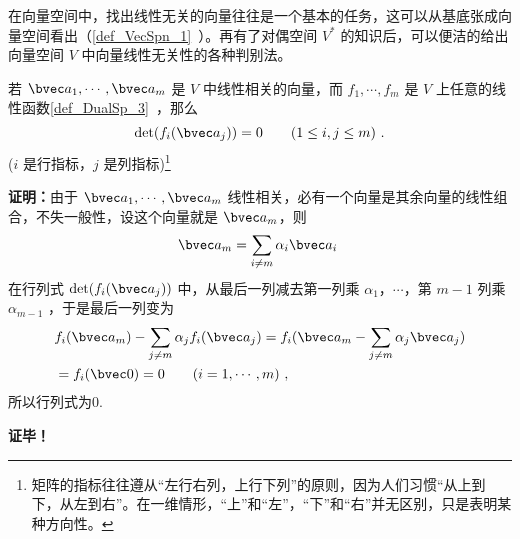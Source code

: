 
\begin{issues}
\end{issues}

在向量空间中，找出线性无关的向量往往是一个基本的任务，这可以从基底张成向量空间看出（\autoref{def_VecSpn_1}~）。再有了对偶空间 $V^*$ 的知识后，可以便洁的给出向量空间 $V$ 中向量线性无关性的各种判别法。
\begin{lemma}{}\label{lem_LinInD_1}
若 $\bvec a_1,\cdots,\bvec a_m$ 是 $V$ 中线性相关的向量，而 $f_1,\cdots,f_m$ 是 $V$ 上任意的线性函数\autoref{def_DualSp_3}~，那么
\begin{equation}
\det(f_i(\bvec a_j))=0\qquad (1\leq i,j\leq m)~.
\end{equation}
($i$ 是行指标，$j$ 是列指标)\footnote{矩阵的指标往往遵从“左行右列，上行下列”的原则，因为人们习惯“从上到下，从左到右”。在一维情形，“上”和“左”，“下”和“右”并无区别，只是表明某种方向性。}
\end{lemma}
\textbf{证明：}由于 $\bvec a_1,\cdots,\bvec a_m$ 线性相关，必有一个向量是其余向量的线性组合，不失一般性，设这个向量就是 $\bvec a_m$，则
\begin{equation}
\bvec a_m=\sum_{i\neq m}\alpha_i\bvec a_i~
\end{equation}
在行列式 $\det(f_i(\bvec a_j))$ 中，从最后一列减去第一列乘 $\alpha_1$，$\cdots$，第 $m-1$ 列乘 $\alpha_{m-1}$ ，于是最后一列变为
\begin{equation}
\begin{aligned}
&f_i(\bvec a_m)-\sum_{j\neq m}\alpha_j f_i(\bvec a_j)=f_i(\bvec a_m-\sum_{j\neq m}\alpha_{j}\bvec a_j)\\
&=f_i(\bvec 0)=0 \qquad (i=1,\cdots ,m)~,
\end{aligned}
\end{equation}
所以行列式为0.

\textbf{证毕！}

